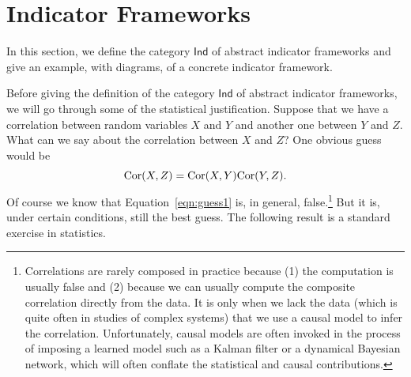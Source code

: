 \documentclass[sigconf]{acmart}
\newcommand{\redout}[1]{{\color{red}#1}}
\newcommand{\Cat}[1]{\mathsf{#1}}
\def\Ind{\Cat{Ind}}
\def\Cor{\textnormal{Cor}}
\begin{document}



\section{Indicator Frameworks}
In this section, we define the category $\Ind$ of abstract indicator frameworks and give an example, with diagrams, of a concrete indicator framework.

Before giving the definition of the category $\Ind$ of abstract indicator frameworks, we will go through some of the statistical justification. Suppose that we have a correlation between random variables $X$ and $Y$ and another one between $Y$ and $Z$. What can we say about the correlation between $X$ and $Z$? One obvious guess would be 
\begin{equation}\label{eqn:guess1}\Cor(X,Z) = \Cor(X,Y)\Cor(Y,Z).\end{equation}
Of course we know that Equation~\ref{eqn:guess1} is, in general, false.\footnote{Correlations are rarely composed in practice because (1) the computation is usually false and (2) because we can usually compute the composite correlation directly from the data. It is only when we lack the data (which is quite often in studies of complex systems) that we use a causal model to infer the correlation. Unfortunately, causal models are often invoked in the process of imposing a learned model such as a Kalman filter or a dynamical Bayesian network, which will often conflate the statistical and causal contributions.} But it is, under certain conditions, still the best guess. The following result is a standard exercise in statistics.%
\end{document}
